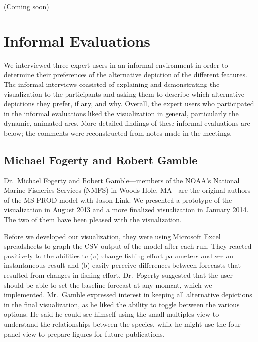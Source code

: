 (Coming soon)

\section{Informal Evaluations}

We interviewed three expert users in an informal environment in order to determine their preferences of the alternative depiction of the different features.  The informal interviews consisted of explaining and demonstrating the visualization to the participants and asking them to describe which alternative depictions they prefer, if any, and why.  Overall, the expert users who participated in the informal evaluations liked the visualization in general, particularly the dynamic, animated arcs.  More detailed findings of these informal evaluations are below; the comments were reconstructed from notes made in the meetings.

\subsection{Michael Fogerty and Robert Gamble} %

Dr.\ Michael Fogerty and Robert Gamble---members of the NOAA's National Marine Fisheries Services (NMFS) in Woods Hole, MA---are the original authors of the MS-PROD model with Jason Link.  We presented a prototype of the visualization in August 2013 and a more finalized visualization in January 2014.  The two of them have been pleased with the visualization.

Before we developed our visualization, they were using Microsoft Excel spreadsheets to graph the CSV output of the model after each run.  They reacted positively to the abilities to (a) change fishing effort parameters and see an instantaneous result and (b) easily perceive differences between forecasts that resulted from changes in fishing effort.  Dr.\ Fogerty suggested that the user should be able to set the baseline forecast at any moment, which we implemented.  Mr.\ Gamble expressed interest in keeping all alternative depictions in the final visualization, as he liked the ability to toggle between the various options.  He said he could see himself using the small multiples view to understand the relationships between the species, while he might use the four-panel view to prepare figures for future publications.

